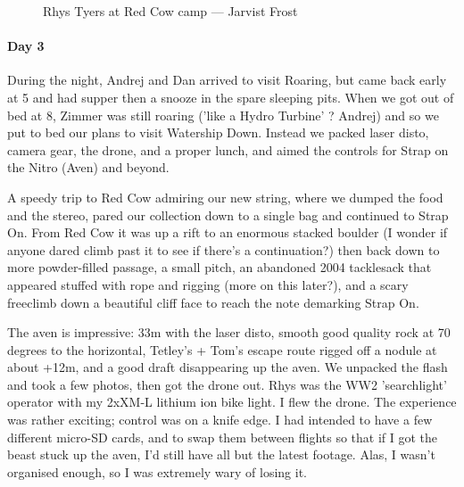 \begin{figure}[h]
\checkoddpage \ifoddpage \forcerectofloat \else \forceversofloat \fi
\centering
{}
\caption{Rhys Tyers at Red Cow camp --- Jarvist Frost}
\label{rhys red cow}
\end{figure}


\paragraph{Day 3}
During the night, Andrej and Dan arrived to visit Roaring, but came back early at 5 and had supper then a snooze in the spare sleeping pits. When we got out of bed at 8, Zimmer was still roaring ('like a Hydro Turbine' ? Andrej) and so we put to bed our plans to visit Watership Down. Instead we packed laser disto, camera gear, the drone, and a proper lunch, and aimed the controls for Strap on the Nitro (Aven) and beyond.

A speedy trip to Red Cow admiring our new string, where we dumped the food and the stereo, pared our collection down to a single bag and continued to Strap On.
From Red Cow it was up a rift to an enormous stacked boulder (I wonder if anyone dared climb past it to see if there's a continuation?) then back down to more powder-filled passage, a small pitch, an abandoned 2004 tacklesack that appeared stuffed with rope and rigging (more on this later?), and a scary freeclimb down a beautiful cliff face to reach the note demarking Strap On.

The aven is impressive: 33m with the laser disto, smooth good quality rock at 70 degrees to the horizontal, Tetley's + Tom's escape route rigged off a nodule at about +12m, and a good draft disappearing up the aven.
We unpacked the flash and took a few photos, then got the drone out. Rhys was the WW2 'searchlight' operator with my 2xXM-L lithium ion bike light. I flew the drone.
The experience was rather exciting; control was on a knife edge. I had intended to have a few different micro-SD cards, and to swap them between flights so that if I got the beast stuck up the aven, I'd still have all but the latest footage. Alas, I wasn't organised enough, so I was extremely wary of losing it.

